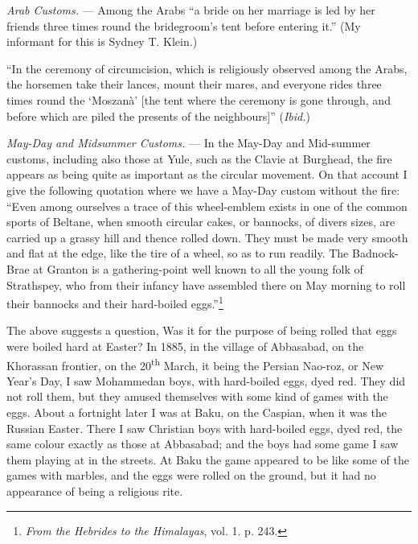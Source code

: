 \documentclass[a4paper, 11pt, oneside, polutonikogreek, english]{article}
\begin{document}
\emph{Arab Customs.} --- Among the Arabs ``a bride on her marriage is led by her friends three times round the bridegroom's tent before entering it.'' (My informant for this is Sydney T. Klein.)

``In the ceremony of circumcision, which is religiously observed among the Arabs, the horsemen take their lances, mount their mares, and everyone rides three times round the `Moszanà' [the tent where the ceremony is gone through, and before which are piled the presents of the neighbours]'' (\emph{Ibid.})

\emph{May-Day and Midsummer Customs.} --- In the May-Day and Mid-summer customs, including also those at Yule, such as the Clavie at Burghead, the fire appears as being quite as important as the circular movement. On that account I give the following quotation where we have a May-Day custom without the fire: ``Even among ourselves a trace of this wheel-emblem exists in one of the common sports of Beltane, when smooth circular cakes, or bannocks, of divers sizes, are carried up a grassy hill and thence rolled down. They must be made very smooth and flat at the edge, like the tire of a wheel, so as to run readily. The Badnock-Brae at Granton is a gathering-point well known to all the young folk of Strathspey, who from their infancy have assembled there on May morning to roll their bannocks and their hard-boiled eggs.''\footnote{\emph{From the Hebrides to the Himalayas}, vol. 1. p. 243.}

The above suggests a question, Was it for the purpose of being rolled that eggs were boiled hard at Easter? In 1885, in the village of Abbasabad, on the Khorassan frontier, on the 20\textsuperscript{th} March, it being the Persian Nao-roz, or New Year's Day, I saw Mohammedan boys, with hard-boiled eggs, dyed red. They did not roll them, but they amused themselves with some kind of games with the eggs. About a fortnight later I was at Baku, on the Caspian, when it was the Russian Easter. There I saw Christian boys with hard-boiled eggs, dyed red, the same colour exactly as those at Abbasabad; and the boys had some game I saw them playing at in the streets. At Baku the game appeared to be like some of the games with marbles, and the eggs were rolled on the ground, but it had no appearance of being a religious rite.
\end{document}
